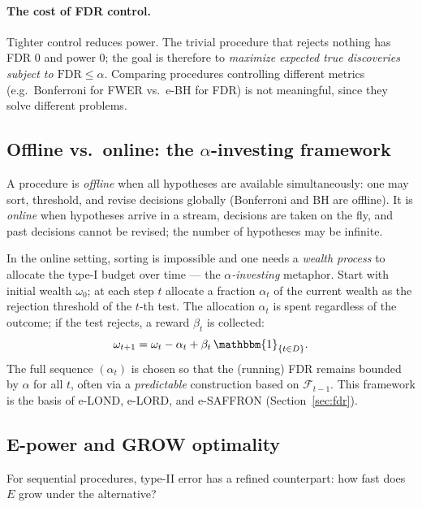 \documentclass[11pt,a4paper,twocolumn]{article}
\theoremstyle{plain}
\theoremstyle{definition}
\theoremstyle{remark}
\newcommand{\ind}{\mathbbm{1}}
\newcommand{\FDR}{\mathrm{FDR}}
\begin{document}
\paragraph{The cost of FDR control.}
Tighter control reduces power. The trivial procedure that rejects nothing has
FDR $0$ and power $0$; the goal is therefore to \emph{maximize expected true
discoveries subject to $\FDR \leq \alpha$}. Comparing procedures controlling
different metrics (e.g.\ Bonferroni for FWER vs.\ e-BH for FDR) is not
meaningful, since they solve different problems.

\subsection{Offline vs.\ online: the $\alpha$-investing framework}
\label{sec:investing}

A procedure is \emph{offline} when all hypotheses are available
simultaneously: one may sort, threshold, and revise decisions globally
(Bonferroni and BH are offline). It is \emph{online} when hypotheses arrive
in a stream, decisions are taken on the fly, and past decisions cannot be
revised; the number of hypotheses may be infinite.

In the online setting, sorting is impossible and one needs a \emph{wealth
process} to allocate the type-I budget over time --- the \emph{$\alpha$-investing}
metaphor. Start with initial wealth $\omega_0$; at each step $t$ allocate a
fraction $\alpha_t$ of the current wealth as the rejection threshold of the
$t$-th test. The allocation $\alpha_t$ is spent regardless of the outcome;
if the test rejects, a reward $\beta_t$ is collected:
\begin{equation}\label{eq:investing}
  \omega_{t+1} = \omega_t - \alpha_t + \beta_t\,\ind_{\{t \in D\}}.
\end{equation}
The full sequence $(\alpha_t)$ is chosen so that the (running) FDR remains
bounded by $\alpha$ for all $t$, often via a \emph{predictable} construction
based on $\mathcal{F}_{t-1}$. This framework is the basis of e-LOND, e-LORD,
and e-SAFFRON (Section~\ref{sec:fdr}).

\subsection{E-power and GROW optimality}

For sequential procedures, type-II error has a refined counterpart: how fast
does $E$ grow under the alternative?
\end{document}
